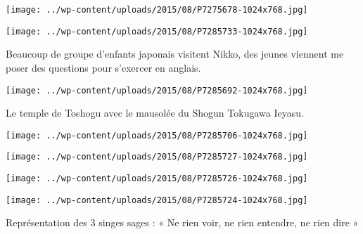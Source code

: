 

\begin{center} \texttt{[image: ../wp-content/uploads/2015/08/P7275678-1024x768.jpg]} \end{center}

 

 

\begin{center} \texttt{[image: ../wp-content/uploads/2015/08/P7285733-1024x768.jpg]} \end{center}

 

 Beaucoup de groupe d'enfants japonais visitent Nikko, des jeunes viennent me poser des questions pour s'exercer en anglais. 

 

\begin{center} \texttt{[image: ../wp-content/uploads/2015/08/P7285692-1024x768.jpg]} \end{center}

 

 Le temple de Toshogu avec le mausolée du Shogun Tokugawa Ieyasu. 

 

\begin{center} \texttt{[image: ../wp-content/uploads/2015/08/P7285706-1024x768.jpg]} \end{center}

 

 

\begin{center} \texttt{[image: ../wp-content/uploads/2015/08/P7285727-1024x768.jpg]} \end{center}

 

 

\begin{center} \texttt{[image: ../wp-content/uploads/2015/08/P7285726-1024x768.jpg]} \end{center}

 

 

\begin{center} \texttt{[image: ../wp-content/uploads/2015/08/P7285724-1024x768.jpg]} \end{center}

 

 Représentation des 3 singes sages : « Ne rien voir, ne rien entendre, ne rien dire » 

